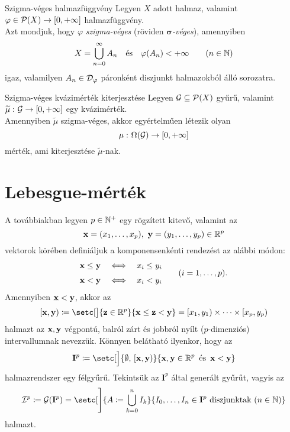 \documentclass[
]{elteikthesis}[2024/04/26]
\begin{document}
	\begin{definition}{Szigma-véges halmazfüggvény}{}
		Legyen \( X \) adott halmaz, 
		valamint \( \varphi \in \mathcal{P}( X ) \to [0, +\infty] \) halmazfüggvény.\\[3pt]
		Azt mondjuk, hogy \( \varphi \) \emph{szigma-véges} 
		(röviden \emph{\( \boldsymbol{\sigma} \)-véges}), amennyiben
		\[
			X = \bigcup_{n=0}^{\infty} A_n 
			\quad \text{és} \quad
			\varphi(A_n) < +\infty \qquad (n \in \mathbb{N})
		\]
		igaz, valamilyen \( A_n \in \mathcal{D}_{\varphi} \) páronként diszjunkt halmazokból álló sorozatra.
	\end{definition}
	
	\begin{theorem}{Szigma-véges kvázimérték kiterjesztése}{}
		Legyen \( \mathcal{G} \subseteq \mathcal{P}( X ) \) gyűrű, 
		valamint \( \widetilde{\mu}  \,\colon  \mathcal{G}  \to  [0, +\infty] \) egy kvázimérték.\\[3pt]
		Amennyiben \( \widetilde{\mu} \) szigma-véges, akkor egyértelműen létezik olyan
		\[
			\mu  \,\colon  \Omega(\mathcal{G})  \to  [0, +\infty]
		\]
		mérték, ami kiterjesztése \( \widetilde{\mu} \)-nak.
	\end{theorem}
	
	\newpage
	\section{Lebesgue-mérték}
	
	A továbbiakban legyen \( p \in \mathbb{N}^+ \) egy rögzített kitevő, valamint az
	\[
		\vb{x} = (x_1, \dots, x_p), \ \vb{y} = (y_1, \dots, y_p) \in \mathbb{R}^p
	\]
	vektorok körében definiáljuk a komponensenkénti rendezést az alábbi módon:
	\[
		\begin{alignedat}{3}
			\x &\leq \y \quad &&\ratio \Longleftrightarrow \quad x_i &&\leq y_i \\[3pt]
			\x &<    \y \quad &&\ratio \Longleftrightarrow \quad x_i &&<    y_i
		\end{alignedat}
		\qquad (i = 1,\dots, p).
	\]
	Amennyiben \( \vb{x} < \vb{y} \), akkor az
	\[
		[\x, \y) \coloneq 
		\setc[\big]{ \vb{z} \in \R^p }{ \x \leq \vb{z} < \y } =
		[ x_1, y_1 ) \times \cdots \times [x_p, y_p )
	\]
	halmazt az \( \vb{x}, \vb{y} \) végpontú, balról zárt és jobbról nyílt (\( p \)-dimenziós) intervallumnak nevezzük. Könnyen belátható ilyenkor, hogy az
	\[
		\mathbf{I}^p \coloneq 
		\setc[\Big]{ \emptyset,\, [\x, \y) }{ \x, \y \in \R^p \,\text{ és }\, \x < \y }
	\]
	halmazrendszer egy félgyűrű. Tekintsük az \( \mathbf{I}^p \) által generált gyűrűt, vagyis az
	\[
		\mathcal{I}^p \coloneq 
		\mathcal{G}( \mathbf{I}^p ) =
		\setc[\Bigg]{ A \coloneq \bigcup_{k=0}^n I_k }
		{ I_0, \dots, I_n \in \mathbf{I}^p \text{ diszjunktak } (n \in \N) }
	\]
	halmazt.
	
\end{document}
